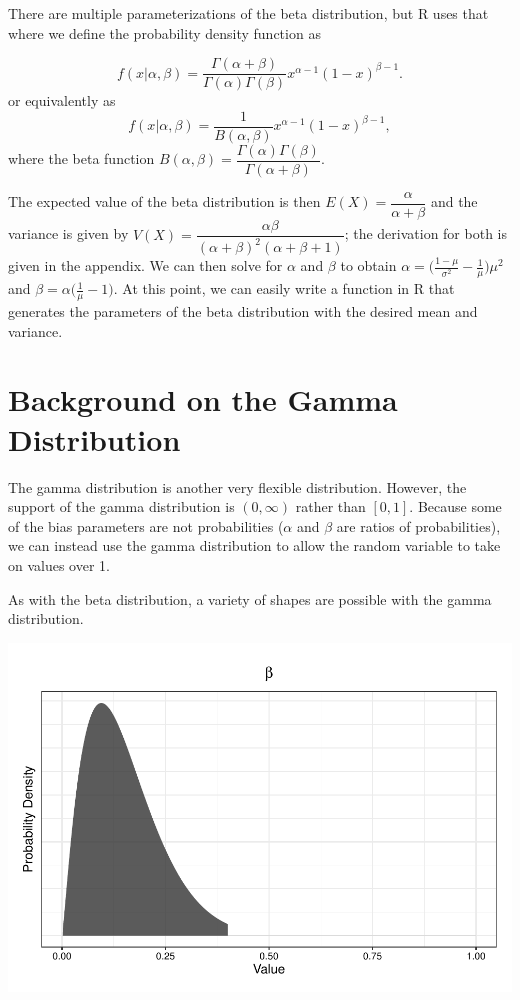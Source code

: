 \documentclass[12pt,twoside]{smiththesis}
\begin{document}
There are multiple parameterizations of the beta distribution, but R uses that where we define the probability density function as

\[
f(x|\alpha,\beta) = \dfrac{\Gamma(\alpha + \beta)}{\Gamma(\alpha) \Gamma(\beta)} x^{\alpha - 1} (1-x)^{\beta - 1}.
\]
or equivalently as
\[
f(x|\alpha,\beta) = \dfrac{1}{B(\alpha,\beta)} x^{\alpha - 1} (1-x)^{\beta - 1},
\]
where the beta function \(B(\alpha, \beta) = \dfrac{\Gamma(\alpha)\Gamma(\beta) }{\Gamma ( \alpha + \beta)}\).

The expected value of the beta distribution is then \(E(X) = \dfrac{\alpha}{\alpha + \beta}\) and the variance is given by \(V(X) = \dfrac{\alpha \beta}{(\alpha + \beta)^2(\alpha + \beta + 1)}\); the derivation for both is given in the appendix. We can then solve for \(\alpha\) and \(\beta\) to obtain \(\alpha = \Big(\frac{1-\mu}{\sigma^2} - \frac{1}{\mu}\Big) \mu^2\) and \(\beta = \alpha\Big(\frac{1}{\mu} - 1\Big)\). At this point, we can easily write a function in R that generates the parameters of the beta distribution with the desired mean and variance.

\hypertarget{background-on-the-gamma-distribution}{%
\section{Background on the Gamma Distribution}\label{background-on-the-gamma-distribution}}

The gamma distribution is another very flexible distribution. However, the support of the gamma distribution is \((0,\infty)\) rather than \([0,1]\). Because some of the bias parameters are not probabilities (\(\alpha\) and \(\beta\) are ratios of probabilities), we can instead use the gamma distribution to allow the random variable to take on values over 1.

As with the beta distribution, a variety of shapes are possible with the gamma distribution.
\begin{center}\includegraphics[width=0.8\linewidth]{thesis_files/figure-latex/unnamed-chunk-44-1} \end{center}
\end{document}
